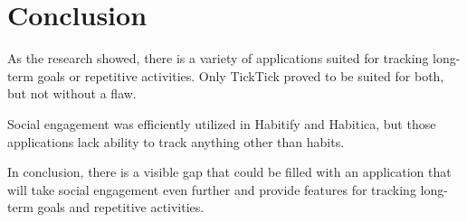 
\section{Conclusion}\label{sec:conclusion}

As the research showed, there is a variety of applications suited for tracking long-term goals or repetitive activities.
Only TickTick proved to be suited for both, but not without a flaw.

Social engagement was efficiently utilized in Habitify and Habitica,
but those applications lack ability to track anything other than habits.

In conclusion, there is a visible gap that could be filled with an application that will take social engagement even further and provide
features for tracking long-term goals and repetitive activities.